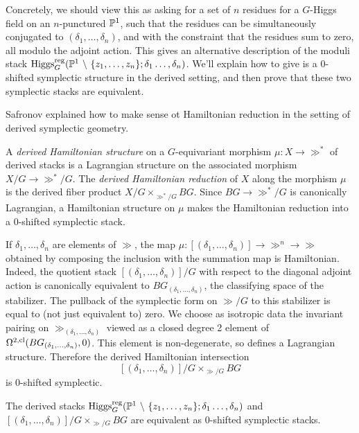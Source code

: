 \documentclass[10pt, oneside, a4paper]{article}
\begin{document}
Concretely, we should view this as asking for a set of $n$ residues for a $G$-Higgs field on an $n$-punctured $\mathbb{P}^1$, such that the residues can be simultaneously conjugated to $(\delta_1, \ldots, \delta_n)$, and with the constraint that the residues sum to zero, all modulo the adjoint action.  This gives an alternative description of the moduli stack $\operatorname{Higgs}_G^{\mathrm{reg}}(\mathbb{P}^1 \ \backslash \  \{z_1, \ldots, z_n\}; \delta_1 \ldots, \delta_n)$.  We'll explain how to give is a 0-shifted symplectic structure in the derived setting, and then prove that these two symplectic stacks are equivalent.

Safronov \cite{Safronovquasi} explained how to make sense ot Hamiltonian reduction in the setting of derived symplectic geometry.
\begin{definition}[Safronov]
A \emph{derived Hamiltonian structure} on a $G$-equivariant morphism $\mu \colon X \to \gg^*$ of derived stacks is a Lagrangian structure on the associated morphism $X/G \to \gg^*/G$.  The \emph{derived Hamiltonian reduction} of $X$ along the morphism $\mu$ is the derived fiber product $X/G \times_{\gg^*/G} BG$.  Since $BG \to \gg^*/G$ is canonically Lagrangian, a Hamiltonian structure on $\mu$ makes the Hamiltonian reduction into a 0-shifted symplectic stack.
\end{definition}

\begin{example} \label{sum_coadjoint_example}
If $\delta_1, \ldots, \delta_n$ are elements of $\gg$, the map $\mu \colon [(\delta_1, \ldots, \delta_n)] \to \gg^n \to \gg$ obtained by composing the inclusion with the summation map is Hamiltonian.  Indeed, the quotient stack $ [(\delta_1, \ldots, \delta_n)]/G$ with respect to the diagonal adjoint action is canonically equivalent to $BG_{(\delta_1, \ldots, \delta_n)}$, the classifying space of the stabilizer.  The pullback of the symplectic form on $\gg/G$ to this stabilizer is equal to (not just equivalent to) zero.  We choose as isotropic data the invariant pairing on $\gg_{(\delta_1, \ldots, \delta_n)}$ viewed as a closed degree 2 element of $\Omega^{2, \mathrm{cl}}(BG_{(\delta_1, \ldots, \delta_n)}, 0)$.  This element is non-degenerate, so defines a Lagrangian structure.  Therefore the derived Hamiltonian intersection
\[[(\delta_1, \ldots, \delta_n)]/G \times_{\gg/G} BG\]
is 0-shifted symplectic.
\end{example}

\begin{theorem} \label{equivalent_hamiltonian_reduction_thm}
The derived stacks $\operatorname{Higgs}_G^{\mathrm{reg}}(\mathbb{P}^1 \ \backslash \  \{z_1, \ldots, z_n\}; \delta_1 \ldots, \delta_n)$ and $[(\delta_1, \ldots, \delta_n)]/G \times_{\gg/G} BG$ are equivalent as 0-shifted symplectic stacks.
\end{theorem}
\end{document}
